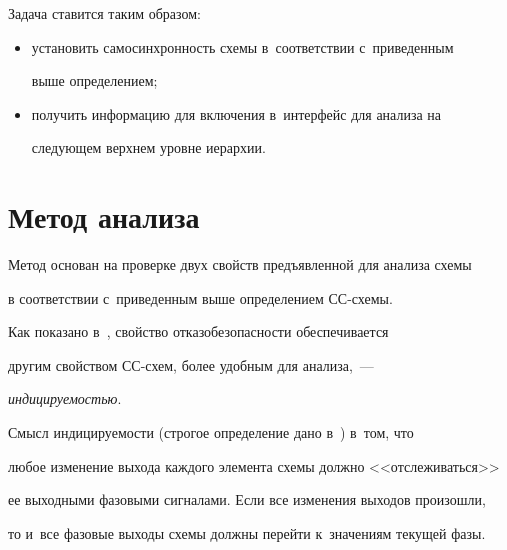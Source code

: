    


   Задача ставится таким образом:


   \begin{itemize}


   \item установить самосинхронность схемы в~соответствии с~приведенным 


выше определением;\\[-14pt]


   \item получить информацию для включения в~интерфейс для анализа на 


следующем верхнем уровне иерархии.


\end{itemize}





\vspace*{-4pt}





\section{Метод анализа}





\vspace*{-2pt}


       


   Метод основан на проверке двух свойств предъявленной для анализа схемы 


в соответствии с~приведенным выше определением СС-схемы.


   


   Как показано в~\cite{1-pl}, свойство отказобезопасности обеспечивается 


другим свойством СС-схем, более удобным для анализа,~--- 


\textit{индицируемостью}.


   


   Смысл индицируемости (строгое определение дано в~\cite{1-pl}) в~том, что 


любое изменение выхода каждого элемента схемы должно <<отслеживаться>> 


ее выходными фазовыми сигналами. Если все изменения выходов произошли, 


то и~все фазовые выходы схемы должны перейти к~значениям текущей фазы. 


